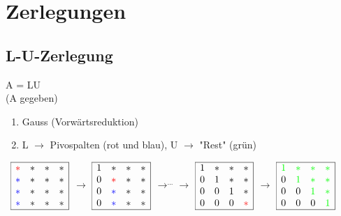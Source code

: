 
\section{Zerlegungen}

\subsection{L-U-Zerlegung}
	A = LU\\
	(A gegeben)
	\begin{enumerate}
		\item Gauss (Vorwärtsreduktion)
		\item L $\rightarrow$ Pivospalten (rot und blau), U $\rightarrow$ "Rest" (grün) 
	\end{enumerate}\ 
	$\begin{array}{|cccc|}
		\hline 
		\color{red}* & * & * & *\\
		\color{blue}* & * & * & *\\
		\color{blue}* & * & * & *\\
		\color{blue}* & * & * & *\\
		\hline
	\end{array}$
	$\rightarrow$
	$\begin{array}{|cccc|}
		\hline 
		1 & * & * & *\\
		0 & \color{red}* & * & *\\
		0 & \color{blue}* & * & *\\
		0 & \color{blue}* & * & *\\
		\hline
	\end{array}$
	$\rightarrow^{...}\rightarrow$
	$\begin{array}{|cccc|}
		\hline 
		1 & * & * & *\\
		0 & 1 & * & *\\
		0 & 0 & 1 & *\\
		0 & 0 & 0 & \color{red}*\\
		\hline
	\end{array}$
	$\rightarrow$
	$\begin{array}{|cccc|}
		\hline 
		\color{green}1 & \color{green}* & \color{green}* & \color{green}*\\
		0 & \color{green}1 & \color{green}* & \color{green}*\\
		0 & 0 & \color{green}1 & \color{green}*\\
		0 & 0 & 0 & \color{green}1\\
		\hline
	\end{array}$\ \ \ \

